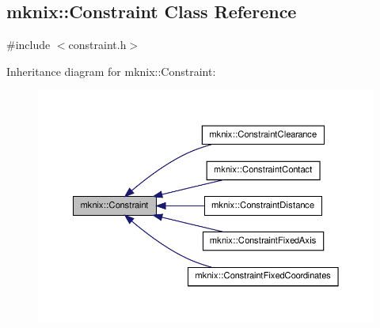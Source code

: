 \hypertarget{classmknix_1_1_constraint}{\subsection{mknix\-:\-:Constraint Class Reference}
\label{classmknix_1_1_constraint}
}


{\ttfamily \#include $<$constraint.\-h$>$}



Inheritance diagram for mknix\-:\-:Constraint\-:\nopagebreak
\begin{figure}[H]
\begin{center}
\leavevmode
\includegraphics[width=350pt]{db/d85/classmknix_1_1_constraint__inherit__graph}
\end{center}
\end{figure}
